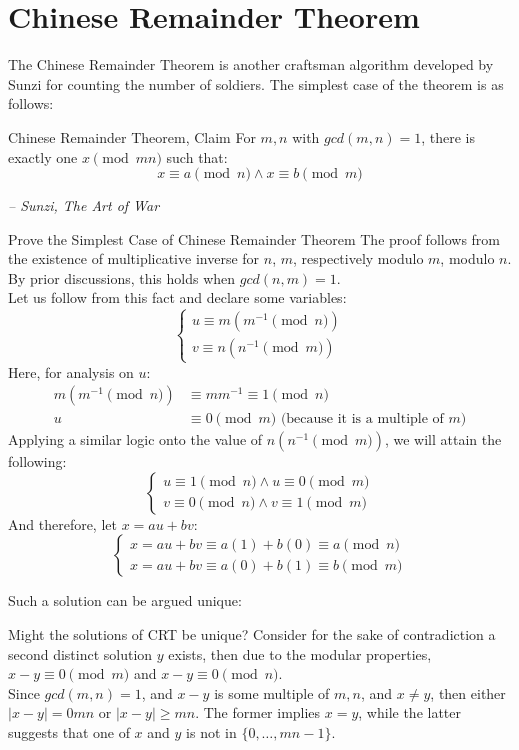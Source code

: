 \section{Chinese Remainder Theorem}
The Chinese Remainder Theorem is another craftsman algorithm developed by Sunzi for counting the number of soldiers. The simplest case of the theorem is as follows:
\begin{ln-define}{Chinese Remainder Theorem, Claim}{}
    For $m,n$ with $gcd(m, n) = 1$, there is exactly one $x\pmod{mn}$ such that:
    \[x \equiv a\pmod{n} \land x \equiv b\pmod{m}\]
    \begin{flushright}
        \textit{-- Sunzi, The Art of War}
    \end{flushright}
\end{ln-define}
\begin{ln-quest}{Prove the Simplest Case of Chinese Remainder Theorem}{}
    The proof follows from the existence of multiplicative inverse for $n$, $m$, respectively modulo $m$, modulo $n$. By prior discussions, this holds when $gcd(n, m) = 1$. \\
    Let us follow from this fact and declare some variables:
    \[
        \begin{cases}
            u \equiv m(m^{-1}\pmod{n}) \\
            v \equiv n(n^{-1}\pmod{m})
        \end{cases}
    \]
    Here, for analysis on $u$: 
    \begin{align*}
        m(m^{-1}\pmod{n}) &\equiv mm^{-1} \equiv 1\pmod{n} \\
        u &\equiv 0\pmod{m} \text{ (because it is a multiple of $m$)}
    \end{align*}
    Applying a similar logic onto the value of $n(n^{-1}\pmod{m})$, we will attain the following:
    \[
        \begin{cases}
            u \equiv 1\pmod{n} \land u \equiv 0\pmod{m} \\
            v \equiv 0\pmod{n} \land v \equiv 1\pmod{m}
        \end{cases}
    \]
    And therefore, let $x = au + bv$:
    \[
        \begin{cases}
            x = au + bv \equiv a(1) + b(0) \equiv a\pmod{n} \\
            x = au + bv \equiv a(0) + b(1) \equiv b\pmod{m}
        \end{cases}
    \]
\end{ln-quest}
Such a solution can be argued unique:
\begin{ln-think}{Might the solutions of CRT be unique?}{}
    Consider for the sake of contradiction a second distinct solution $y$ exists, then due to the modular properties, $x - y \equiv 0\pmod{m}$ and $x - y \equiv 0\pmod{n}$. \\
    Since $gcd(m, n) = 1$, and $x - y$ is some multiple of $m, n$, and $x \neq y$, then either $|x - y| = 0mn$ or $|x - y| \geq mn$. The former implies $x = y$, while the latter suggests that one of $x$ and $y$ is not in $\{0, \dots, mn - 1\}$.
\end{ln-think}
